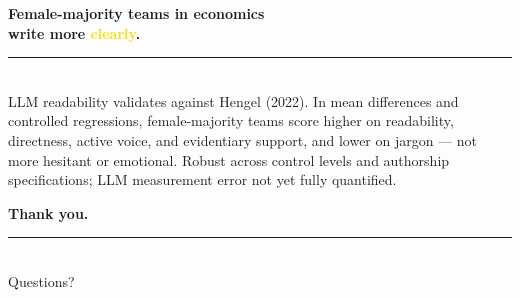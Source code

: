 \documentclass[aspectratio=169,11pt]{beamer}
\begin{document}
{
\begin{frame}[plain]
    \vfill
    \begin{center}
        {\LARGE\bfseries\color{SoftWhite}
        Female-majority teams in economics\\[0.3cm]
        write more \textcolor{Gold}{clearly}.}\\[0.6cm]
        \textcolor{WarmGray}{\rule{0.45\textwidth}{0.4pt}}\\[0.5cm]
        {\large\color{LightGray}
        LLM readability validates against Hengel (2022). In mean differences and controlled regressions,
        female-majority teams score higher on readability, directness, active voice, and evidentiary support,
        and lower on jargon --- not more hesitant or emotional.
        Robust across control levels and authorship specifications;
        LLM measurement error not yet fully quantified.}
    \end{center}
    \vfill
\end{frame}
}

{
\begin{frame}[plain]
    \vfill
    \begin{center}
        {\Huge\bfseries\color{SoftWhite} Thank you.}\\[0.8cm]
        \textcolor{WarmGray}{\rule{0.35\textwidth}{0.4pt}}\\[0.8cm]
        {\LARGE\color{Gold} Questions?}
    \end{center}
    \vfill
\end{frame}
}

\appendix
\end{document}
